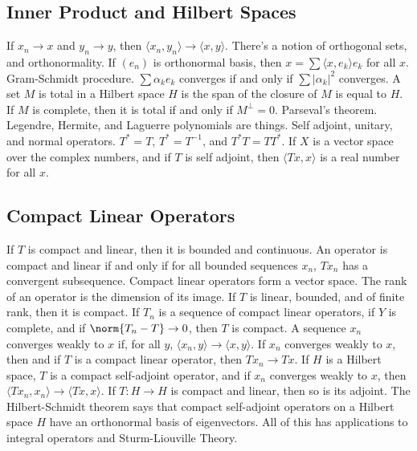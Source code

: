         \subsection{Inner Product and Hilbert Spaces}
            If $x_{n}\rightarrow{x}$ and $y_{n}\rightarrow{y}$,
            then
            $\langle{x_{n},y_{n}}\rangle\rightarrow\langle{x,y}\rangle$.
            There's a notion of orthogonal sets,
            and orthonormality. If $(e_{n})$ is orthonormal basis,
            then $x=\sum\langle{x,e_{k}}\rangle{e_{k}}$
            for all $x$. Gram-Schmidt procedure.
            $\sum\alpha_{k}e_{k}$ converges if and only if
            $\sum|\alpha_{k}|^{2}$ converges.
            A set $M$ is total in a Hilbert space $H$ is the
            span of the closure of $M$ is equal
            to $H$. If $M$ is complete, then it is
            total if and only if $M^{\perp}=0$.
            Parseval's theorem. Legendre, Hermite, and Laguerre
            polynomials are things.
            Self adjoint, unitary, and normal operators.
            $T^{*}=T$, $T^{*}=T^{-1}$, and $T^{*}T=TT^{*}$. If
            $X$ is a vector space over the complex numbers,
            and if $T$ is self adjoint, then
            $\langle{Tx,x}\rangle$ is a real number for all $x$.
        \subsection{Compact Linear Operators}
            If $T$ is compact and linear, then it is bounded and
            continuous. An operator is compact and linear
            if and only if
            for all bounded sequences $x_{n}$,
            $Tx_{n}$ has a convergent subsequence. Compact linear
            operators form a vector space. The rank of an
            operator is
            the dimension of its image. If $T$ is linear,
            bounded, and of finite rank, then it is compact.
            If $T_{n}$ is a sequence of compact linear
            operators, if $Y$ is
            complete, and if $\norm{T_{n}-T}\rightarrow{0}$, then
            $T$ is compact. A sequence $x_{n}$ converges weakly to
            $x$ if, for all $y$,
            $\langle{x_{n},y}\rangle\rightarrow\langle{x,y}\rangle$.
            If $x_{n}$ converges weakly to $x$, then
            and if $T$ is a compact linear operator, then
            $Tx_{n}\rightarrow{Tx}$. If $H$ is a Hilbert space,
            $T$ is a compact self-adjoint operator, and if
            $x_{n}$ converges weakly to $x$, then
            $\langle{Tx_{n},x_{n}}\rangle\rightarrow\langle{Tx,x}\rangle$.
            If $T:H\rightarrow{H}$ is compact and linear, then so
            is its adjoint. The Hilbert-Schmidt theorem says that
            compact self-adjoint operators on a Hilbert space $H$
            have an orthonormal basis of eigenvectors. All of this
            has applications to integral operators and
            Sturm-Liouville Theory.
